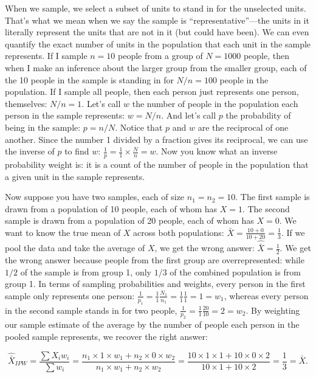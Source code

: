 \documentclass[
]{article}
\begin{document}
When we sample, we select a subset of units to stand in for the
unselected units. That's what we mean when we say the sample is
``representative''---the units in it literally represent the units that
are not in it (but could have been). We can even quantify the exact
number of units in the population that each unit in the sample
represents. If I sample \(n = 10\) people from a group of \(N = 1000\)
people, then when I make an inference about the larger group from the
smaller group, each of the 10 people in the sample is standing in for
\(N/n = 100\) people in the population. If I sample all people, then
each person just represents one person, themselves: \(N/n = 1\). Let's
call \(w\) the number of people in the population each person in the
sample represents: \(w = N / n\). And let's call \(p\) the probability
of being in the sample: \(p = n / N\). Notice that \(p\) and \(w\) are
the reciprocal of one another. Since the number 1 divided by a fraction
gives its reciprocal, we can use the inverse of \(p\) to find \(w\):
\(\frac{1}{p} = \frac{1}{1} \times \frac{N}{n} = w\). Now you know what
an inverse probability weight is: it is a count of the number of people
in the population that a given unit in the sample represents.

Now suppose you have two samples, each of size \(n_1 = n_2 = 10\). The
first sample is drawn from a population of 10 people, each of whom has
\(X = 1\). The second sample is drawn from a population of 20 people,
each of whom has \(X = 0\). We want to know the true mean of \(X\)
across both populations:
\(\bar{X} = \frac{10 + 0}{10 + 20} = \frac{1}{3}\). If we pool the data
and take the average of \(X\), we get the wrong answer:
\(\hat{\bar{X}} = \frac{1}{2}\). We get the wrong answer because people
from the first group are overrepresented: while \(1/2\) of the sample is
from group 1, only \(1/3\) of the combined population is from group 1.
In terms of sampling probabilities and weights, every person in the
first sample only represents one person:
\(\frac{1}{p_1} = \frac{1}{1} \frac{N_1}{n_1} = \frac{1}{1} \frac{1}{1} = 1 = w_1\),
whereas every person in the second sample stands in for two people,
\(\frac{1}{p_2} = \frac{1}{1} \frac{20}{10} = 2 = w_2\). By weighting
our sample estimate of the average by the number of people each person
in the pooled sample represents, we recover the right answer:

\[\hat{\bar{X}}_{IPW} = \frac{\sum X_i w_i}{\sum w_i} = \frac{n_1 \times 1 \times w_1 + n_2 \times 0 \times w_2}{n_1 \times w_1 + n_2 \times w_2} = \frac{10 \times 1\times 1 + 10 \times 0 \times 2}{10 \times 1 + 10 \times 2} = \frac{1}{3} = \bar{X}.\]
\end{document}
